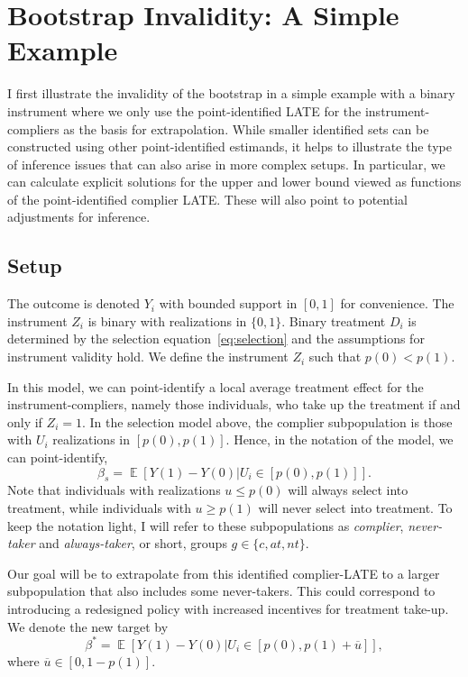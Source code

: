 \documentclass[12pt,a4paper,english]{article} %
\DeclareMathOperator*{\E}{\mathbb{E}}
\numberwithin{equation}{section}
\theoremstyle{definition}
\theoremstyle{remark}
\theoremstyle{plain}
\begin{document}
\section{Bootstrap Invalidity: A Simple Example}\label{sec:simple_example}
I first illustrate the invalidity of the bootstrap in a simple example with a binary instrument where we only use the point-identified LATE for the instrument-compliers as the basis for extrapolation.
While smaller identified sets can be constructed using other point-identified estimands, it helps to illustrate the type of inference issues that can also arise in more complex setups.
In particular, we can calculate explicit solutions for the upper and lower bound viewed as functions of the point-identified complier LATE.\@
These will also point to potential adjustments for inference.

\subsection{Setup}
The outcome is denoted $Y_i$ with bounded support in $[0,1]$ for convenience.
The instrument $Z_i$ is binary with realizations in $\{0,1\}$.
Binary treatment $D_i$ is determined by the selection equation~\ref{eq:selection} and the assumptions for instrument validity hold.
We define the instrument $Z_i$ such that $p(0)<p(1)$.

In this model, we can point-identify a local average treatment effect for the instrument-compliers, namely those individuals, who take up the treatment if and only if $Z_i=1$.
In the selection model above, the complier subpopulation is those with $U_i$ realizations in $[p(0), p(1)]$.
Hence, in the notation of the model, we can point-identify,
\begin{equation}
  \beta_s = \E[Y(1) - Y(0)|U_i\in[p(0), p(1)]].
\end{equation}
Note that individuals with realizations $u \leq p(0)$ will always select into treatment, while individuals with $u \geq p(1)$ will never select into treatment.
To keep the notation light, I will refer to these subpopulations as \textit{complier}, \textit{never-taker} and \textit{always-taker}, or short, groups $g\in\{c, at, nt\}$.

Our goal will be to extrapolate from this identified complier-LATE to a larger subpopulation that also includes some never-takers.
This could correspond to introducing a redesigned policy with increased incentives for treatment take-up.
We denote the new target by
\begin{equation}
  \beta^* = \E[Y(1) - Y(0)|U_i \in[p(0), p(1) + \overline{u}]],
\end{equation}
where $\overline{u}\in[0, 1-p(1)]$.
\end{document}
